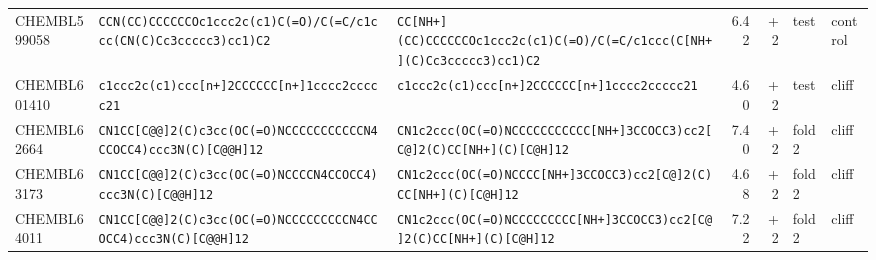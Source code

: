 \begin{longtable}{l p{4.4cm} p{4.4cm} r r l l}
CHEMBL599058 & \texttt{CCN(\allowbreak{}CC)\allowbreak{}CCCCCCOc1ccc2c(\allowbreak{}c1)\allowbreak{}C(\allowbreak{}=\allowbreak{}O)\allowbreak{}/\allowbreak{}C(\allowbreak{}=\allowbreak{}C/\allowbreak{}c1ccc(\allowbreak{}CN(\allowbreak{}C)\allowbreak{}Cc3ccccc3)\allowbreak{}cc1)\allowbreak{}C2} & \texttt{CC[NH+]\allowbreak{}(\allowbreak{}CC)\allowbreak{}CCCCCCOc1ccc2c(\allowbreak{}c1)\allowbreak{}C(\allowbreak{}=\allowbreak{}O)\allowbreak{}/\allowbreak{}C(\allowbreak{}=\allowbreak{}C/\allowbreak{}c1ccc(\allowbreak{}C[NH+]\allowbreak{}(\allowbreak{}C)\allowbreak{}Cc3ccccc3)\allowbreak{}cc1)\allowbreak{}C2} & 6.42 & +2 & test & control \\
CHEMBL601410 & \texttt{c1ccc2c(\allowbreak{}c1)\allowbreak{}ccc[n+]\allowbreak{}2CCCCCC[n+]\allowbreak{}1cccc2ccccc21} & \texttt{c1ccc2c(\allowbreak{}c1)\allowbreak{}ccc[n+]\allowbreak{}2CCCCCC[n+]\allowbreak{}1cccc2ccccc21} & 4.60 & +2 & test & cliff \\
CHEMBL62664 & \texttt{CN1CC[C@@]\allowbreak{}2(\allowbreak{}C)\allowbreak{}c3cc(\allowbreak{}OC(\allowbreak{}=\allowbreak{}O)\allowbreak{}NCCCCCCCCCCCN4CCOCC4)\allowbreak{}ccc3N(\allowbreak{}C)\allowbreak{}[C@@H]\allowbreak{}12} & \texttt{CN1c2ccc(\allowbreak{}OC(\allowbreak{}=\allowbreak{}O)\allowbreak{}NCCCCCCCCCCC[NH+]\allowbreak{}3CCOCC3)\allowbreak{}cc2[C@]\allowbreak{}2(\allowbreak{}C)\allowbreak{}CC[NH+]\allowbreak{}(\allowbreak{}C)\allowbreak{}[C@H]\allowbreak{}12} & 7.40 & +2 & fold 2 & cliff \\
CHEMBL63173 & \texttt{CN1CC[C@@]\allowbreak{}2(\allowbreak{}C)\allowbreak{}c3cc(\allowbreak{}OC(\allowbreak{}=\allowbreak{}O)\allowbreak{}NCCCCN4CCOCC4)\allowbreak{}ccc3N(\allowbreak{}C)\allowbreak{}[C@@H]\allowbreak{}12} & \texttt{CN1c2ccc(\allowbreak{}OC(\allowbreak{}=\allowbreak{}O)\allowbreak{}NCCCC[NH+]\allowbreak{}3CCOCC3)\allowbreak{}cc2[C@]\allowbreak{}2(\allowbreak{}C)\allowbreak{}CC[NH+]\allowbreak{}(\allowbreak{}C)\allowbreak{}[C@H]\allowbreak{}12} & 4.68 & +2 & fold 2 & cliff \\
CHEMBL64011 & \texttt{CN1CC[C@@]\allowbreak{}2(\allowbreak{}C)\allowbreak{}c3cc(\allowbreak{}OC(\allowbreak{}=\allowbreak{}O)\allowbreak{}NCCCCCCCCCN4CCOCC4)\allowbreak{}ccc3N(\allowbreak{}C)\allowbreak{}[C@@H]\allowbreak{}12} & \texttt{CN1c2ccc(\allowbreak{}OC(\allowbreak{}=\allowbreak{}O)\allowbreak{}NCCCCCCCCC[NH+]\allowbreak{}3CCOCC3)\allowbreak{}cc2[C@]\allowbreak{}2(\allowbreak{}C)\allowbreak{}CC[NH+]\allowbreak{}(\allowbreak{}C)\allowbreak{}[C@H]\allowbreak{}12} & 7.22 & +2 & fold 2 & cliff \\

\end{longtable}
